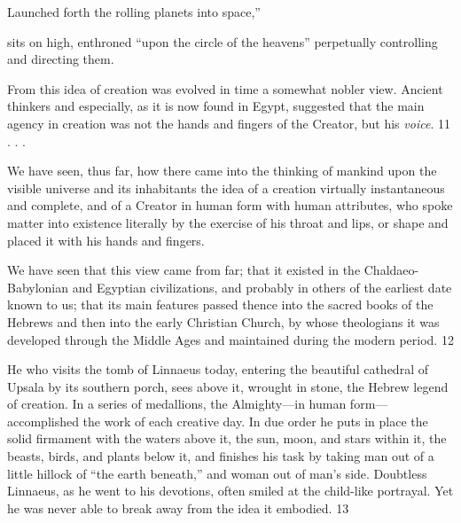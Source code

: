 Launched forth the rolling planets into space,''

sits on high, enthroned ``upon the circle of the heavens'' perpetually controlling and directing
them.

From this idea of creation was evolved in time a somewhat nobler view. Ancient thinkers and
especially, as it is now found in Egypt, suggested that the main agency in creation was not
the hands and fingers of the Creator, but his \textit{voice}. 11 . . .

We have seen, thus far, how there came into the thinking of mankind upon the visible
universe and its inhabitants the idea of a creation virtually instantaneous and complete, and
of a Creator in human form with human attributes, who spoke matter into existence literally
by the exercise of his throat and lips, or shape and placed it with his hands and fingers.

We have seen that this view came from far; that it existed in the Chaldaeo-Babylonian and
Egyptian civilizations, and probably in others of the earliest date known to us; that its main
features passed thence into the sacred books of the Hebrews and then into the early Christian
Church, by whose theologians it was developed through the Middle Ages and maintained
during the modern period. 12

He who visits the tomb of Linnaeus today, entering the beautiful cathedral of Upsala by its
southern porch, sees above it, wrought in stone, the Hebrew legend of creation. In a series of
medallions, the Almighty—in human form—accomplished the work of each creative day. In
due order he puts in place the solid firmament with the waters above it, the sun, moon, and
stars within it, the beasts, birds, and plants below it, and finishes his task by taking man out
of a little hillock of ``the earth beneath,'' and woman out of man's side. Doubtless Linnaeus,
as he went to his devotions, often smiled at the child-like portrayal. Yet he was never able to
break away from the idea it embodied. 13

